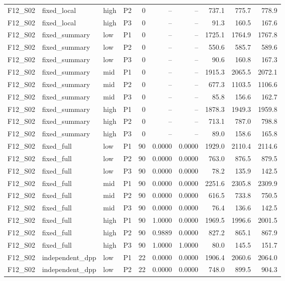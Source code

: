 \begin{longtable}{llllrrrrrr}
F12\_S02 & fixed\_local & high & P2 & 0 & -- & -- & 737.1 & 775.7 & 778.9 \\
F12\_S02 & fixed\_local & high & P3 & 0 & -- & -- & 91.3 & 160.5 & 167.6 \\
F12\_S02 & fixed\_summary & low & P1 & 0 & -- & -- & 1725.1 & 1764.9 & 1767.8 \\
F12\_S02 & fixed\_summary & low & P2 & 0 & -- & -- & 550.6 & 585.7 & 589.6 \\
F12\_S02 & fixed\_summary & low & P3 & 0 & -- & -- & 90.6 & 160.8 & 167.3 \\
F12\_S02 & fixed\_summary & mid & P1 & 0 & -- & -- & 1915.3 & 2065.5 & 2072.1 \\
F12\_S02 & fixed\_summary & mid & P2 & 0 & -- & -- & 677.3 & 1103.5 & 1106.6 \\
F12\_S02 & fixed\_summary & mid & P3 & 0 & -- & -- & 85.8 & 156.6 & 162.7 \\
F12\_S02 & fixed\_summary & high & P1 & 0 & -- & -- & 1878.3 & 1949.3 & 1959.8 \\
F12\_S02 & fixed\_summary & high & P2 & 0 & -- & -- & 713.1 & 787.0 & 798.8 \\
F12\_S02 & fixed\_summary & high & P3 & 0 & -- & -- & 89.0 & 158.6 & 165.8 \\
F12\_S02 & fixed\_full & low & P1 & 90 & 0.0000 & 0.0000 & 1929.0 & 2110.4 & 2114.6 \\
F12\_S02 & fixed\_full & low & P2 & 90 & 0.0000 & 0.0000 & 763.0 & 876.5 & 879.5 \\
F12\_S02 & fixed\_full & low & P3 & 90 & 0.0000 & 0.0000 & 78.2 & 135.9 & 142.5 \\
F12\_S02 & fixed\_full & mid & P1 & 90 & 0.0000 & 0.0000 & 2251.6 & 2305.8 & 2309.9 \\
F12\_S02 & fixed\_full & mid & P2 & 90 & 0.0000 & 0.0000 & 616.5 & 733.8 & 750.5 \\
F12\_S02 & fixed\_full & mid & P3 & 90 & 0.0000 & 0.0000 & 76.4 & 136.6 & 142.5 \\
F12\_S02 & fixed\_full & high & P1 & 90 & 1.0000 & 0.0000 & 1969.5 & 1996.6 & 2001.5 \\
F12\_S02 & fixed\_full & high & P2 & 90 & 0.9889 & 0.0000 & 827.2 & 865.1 & 867.9 \\
F12\_S02 & fixed\_full & high & P3 & 90 & 1.0000 & 1.0000 & 80.0 & 145.5 & 151.7 \\
F12\_S02 & independent\_dpp & low & P1 & 22 & 0.0000 & 0.0000 & 1906.4 & 2060.6 & 2064.0 \\
F12\_S02 & independent\_dpp & low & P2 & 22 & 0.0000 & 0.0000 & 748.0 & 899.5 & 904.3 \\

\end{longtable}
